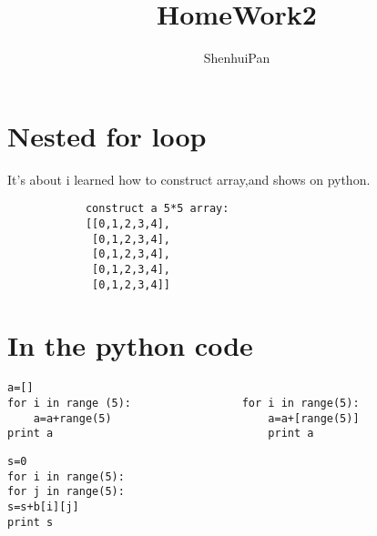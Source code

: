 \documentclass{tufte-handout}
\title{HomeWork2}
\author[The Academy]{ShenhuiPan}
\begin{document}
\maketitle%



\normalsize

\vspace{1cm}
\section{Nested for loop}

It's about i learned how to construct array,and shows on python.


\begin{shaded}
\begin{verbatim}
            construct a 5*5 array:
            [[0,1,2,3,4],
             [0,1,2,3,4],
             [0,1,2,3,4],
             [0,1,2,3,4],
             [0,1,2,3,4]]
\end{verbatim}
\end{shaded}

\vspace{1cm}

\section{In the python code}


\begin{framed}
\begin{verbatim}
a=[]                         
for i in range (5):                 for i in range(5):
    a=a+range(5)                        a=a+[range(5)]
print a                                 print a  
\end{verbatim}
\end{framed}


\begin{shaded}
\begin{verbatim}
s=0
for i in range(5):
for j in range(5):
s=s+b[i][j]
print s
\end{verbatim}
\end{shaded}



\end{document}
